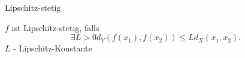 \documentclass[class=article, crop=false]{standalone}
\begin{document}
\begin{zettel}{Lipschitz-stetig}
\begin{flashcard}[]{}
	\begin{definition}
		$f$ ist Lipschitz-stetig, falls
		\[
			\exists L > 0 d_Y (f(x_1),f(x_2)) \leq L d_X (x_1,x_2)
		.\]
		$L$ - Lipschitz-Konstante
	\end{definition}
\end{flashcard}
\end{zettel}
\end{document}
